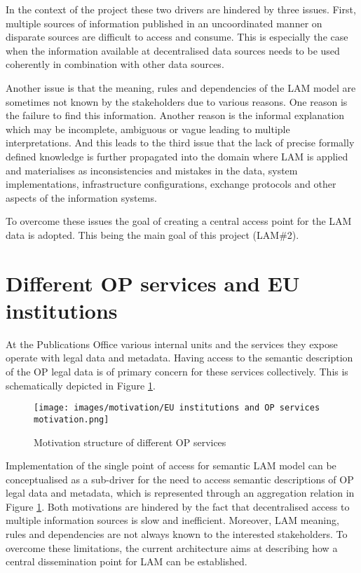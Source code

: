 	In the context of the project these two drivers are hindered by three issues. First, multiple sources of information published in an uncoordinated manner on disparate sources are difficult to access and consume. This is especially the case when the information available at decentralised data sources needs to be used coherently in combination with other data sources.

	Another issue is that the meaning, rules and dependencies of the LAM model are sometimes not known by the stakeholders due to various reasons. One reason is the failure to find this information. Another reason is the informal explanation which may be incomplete, ambiguous or vague leading to multiple interpretations. And this leads to the third issue that the lack of precise formally defined knowledge is further propagated into the domain where LAM is applied and materialises as inconsistencies and mistakes in the data, system implementations, infrastructure configurations, exchange protocols and other aspects of the information systems. 
	
	To overcome these issues the goal of creating a central access point for the LAM data is adopted. This being the main goal of this project (LAM\#2). 	

	\section{Different OP services and EU institutions}
	
	At the Publications Office various internal units and the services they expose operate with legal data and metadata. Having access to the semantic description of the OP legal data is of primary concern for these services collectively. This is schematically depicted in Figure \ref{fig:motivation-op-services}.
	
	\begin{figure}[!th]
		\centering
		\texttt{[image: images/motivation/EU institutions and OP services motivation.png]}
		\caption{Motivation structure of different OP services}
		\label{fig:motivation-op-services}
	\end{figure}

	Implementation of the single point of access for semantic LAM model can be conceptualised as a sub-driver for the need to access semantic descriptions of OP legal data and metadata, which is represented through an aggregation relation in Figure \ref{fig:motivation-op-services}. Both motivations are hindered by the fact that decentralised access to multiple information sources is slow and inefficient. Moreover, LAM meaning, rules and dependencies are not always known to the interested stakeholders. To overcome these limitations, the current architecture aims at describing how a central dissemination point for LAM can be established. 
	
